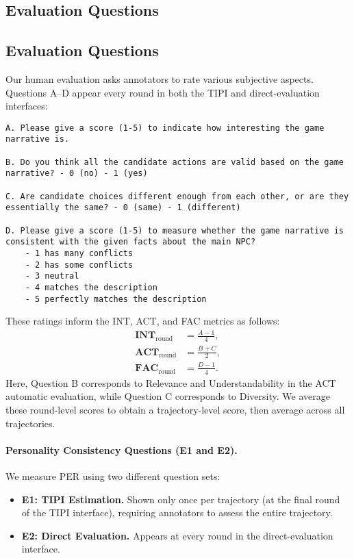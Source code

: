 \subsection{Evaluation Questions}
\subsection{Evaluation Questions}
Our human evaluation asks annotators to rate various subjective aspects. Questions A--D appear every round in both the TIPI and direct-evaluation interfaces:
\begin{center}
\begin{minipage}{0.95\textwidth}
\begin{lstlisting}[language=plaintext, frame=none, numbers=none]
A. Please give a score (1-5) to indicate how interesting the game narrative is.

B. Do you think all the candidate actions are valid based on the game narrative? - 0 (no) - 1 (yes)
    
C. Are candidate choices different enough from each other, or are they essentially the same? - 0 (same) - 1 (different)
    
D. Please give a score (1-5) to measure whether the game narrative is consistent with the given facts about the main NPC? 
    - 1 has many conflicts
    - 2 has some conflicts
    - 3 neutral
    - 4 matches the description
    - 5 perfectly matches the description
\end{lstlisting}
\end{minipage}
\end{center}
These ratings inform the INT, ACT, and FAC metrics as follows:
\begin{equation}
    \begin{aligned}
        \textbf{INT}_\text{round} &= \frac{A - 1}{4},\\
        \textbf{ACT}_\text{round} &= \frac{B + C}{2},\\
        \textbf{FAC}_\text{round} &= \frac{D - 1}{4}.
    \end{aligned}
\end{equation}
Here, Question B corresponds to Relevance and Understandability in the ACT automatic evaluation, while Question C corresponds to Diversity. We average these round-level scores to obtain a trajectory-level score, then average across all trajectories.

\paragraph{Personality Consistency Questions (E1 and E2).}
We measure PER using two different question sets:
\begin{itemize}
    \item \textbf{E1: TIPI Estimation.}  
    Shown only once per trajectory (at the final round of the TIPI interface), requiring annotators to assess the entire trajectory.  
    \item \textbf{E2: Direct Evaluation.}  
    Appears at every round in the direct-evaluation interface.
\end{itemize}

